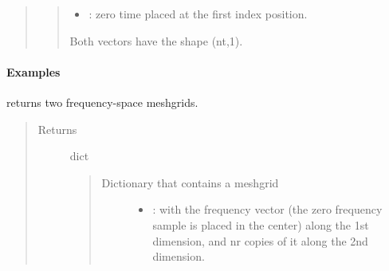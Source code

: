 \documentclass[letterpaper,10pt,english]{sphinxmanual}
\begin{document}
\begin{fulllineitems}
\begin{fulllineitems}
\begin{quote}
\begin{description}
\begin{quote}
\begin{description}
\begin{itemize}
\item {} 
: zero time placed at the first index position.

\end{itemize}

\end{description}

Both vectors have the shape (nt,1).
\end{quote}

\end{description}\end{quote}
\paragraph{Examples}

%
\begin{sphinxVerbatim}[commandchars=\\\{\}]
     
\PYG{p}{[}\PYG{p}{]}
\end{sphinxVerbatim}

\end{fulllineitems}


\begin{fulllineitems}
\label{\detokenize{Wavefield_NRM_p_w:Wavefield_NRM_p_w.Wavefield_NRM_p_w.W_X_grid}}
returns two frequency-space meshgrids.
\begin{quote}\begin{description}
\item[{Returns}] \leavevmode
dict
\begin{quote}
\begin{description}
\item[{Dictionary that contains a meshgrid}] \leavevmode\begin{itemize}
\item {} 
: with the frequency vector  (the zero frequency sample is placed in the center) along the 1st dimension, and nr copies of it along the 2nd dimension.


\end{itemize}
\end{description}
\end{quote}
\end{description}
\end{quote}
\end{fulllineitems}
\end{fulllineitems}
\end{document}
